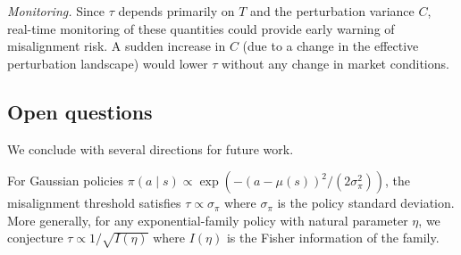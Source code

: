 \emph{Monitoring.}
Since $\tau$ depends primarily on $T$ and the perturbation variance $C$,
real-time monitoring of these quantities could provide early warning of
misalignment risk. A sudden increase in $C$ (due to a change in the
effective perturbation landscape) would lower $\tau$ without any change
in market conditions.

\subsection{Open questions}

We conclude with several directions for future work.

\begin{conjecture}\label{conj:non-softmax}
For Gaussian policies $\pi(a \mid s) \propto \exp(-(a - \mu(s))^2 /
(2\sigma_\pi^2))$, the misalignment threshold satisfies
$\tau \propto \sigma_\pi$ where $\sigma_\pi$ is the policy standard
deviation. More generally, for any exponential-family policy with natural
parameter $\eta$, we conjecture $\tau \propto 1/\sqrt{I(\eta)}$ where
$I(\eta)$ is the Fisher information of the family.
\end{conjecture}

